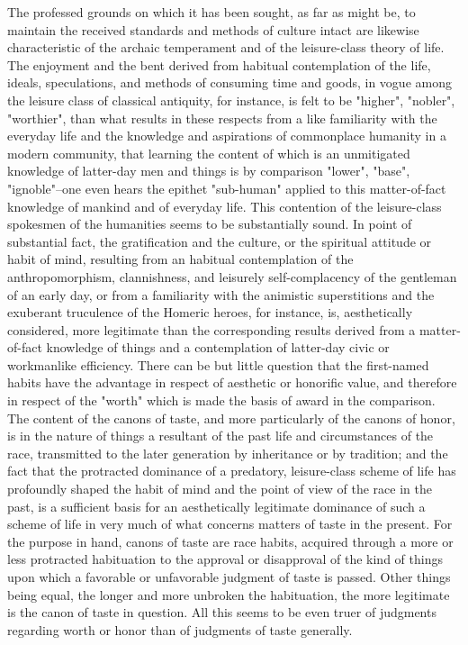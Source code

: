 \documentclass[12pt]{report}
\begin{document}
The professed grounds on which it has been sought, as far as might be,
to maintain the received standards and methods of culture intact
are likewise characteristic of the archaic temperament and of the
leisure-class theory of life. The enjoyment and the bent derived from
habitual contemplation of the life, ideals, speculations, and methods of
consuming time and goods, in vogue among the leisure class of classical
antiquity, for instance, is felt to be "higher", "nobler", "worthier",
than what results in these respects from a like familiarity with the
everyday life and the knowledge and aspirations of commonplace humanity
in a modern community, that learning the content of which is an
unmitigated knowledge of latter-day men and things is by comparison
"lower", "base", "ignoble"--one even hears the epithet "sub-human"
applied to this matter-of-fact knowledge of mankind and of everyday
life.
\clearpage
This contention of the leisure-class spokesmen of the humanities
seems to be substantially sound. In point of substantial fact, the
gratification and the culture, or the spiritual attitude or habit of
mind, resulting from an habitual contemplation of the anthropomorphism,
clannishness, and leisurely self-complacency of the gentleman of an
early day, or from a familiarity with the animistic superstitions
and the exuberant truculence of the Homeric heroes, for instance, is,
aesthetically considered, more legitimate than the corresponding results
derived from a matter-of-fact knowledge of things and a contemplation
of latter-day civic or workmanlike efficiency. There can be but little
question that the first-named habits have the advantage in respect of
aesthetic or honorific value, and therefore in respect of the "worth"
which is made the basis of award in the comparison. The content of the
canons of taste, and more particularly of the canons of honor, is in the
nature of things a resultant of the past life and circumstances of
the race, transmitted to the later generation by inheritance or by
tradition; and the fact that the protracted dominance of a predatory,
leisure-class scheme of life has profoundly shaped the habit of mind and
the point of view of the race in the past, is a sufficient basis for an
aesthetically legitimate dominance of such a scheme of life in very much
of what concerns matters of taste in the present. For the purpose in
hand, canons of taste are race habits, acquired through a more or less
protracted habituation to the approval or disapproval of the kind
of things upon which a favorable or unfavorable judgment of taste is
passed. Other things being equal, the longer and more unbroken the
habituation, the more legitimate is the canon of taste in question. All
this seems to be even truer of judgments regarding worth or honor than
of judgments of taste generally.
\end{document}
